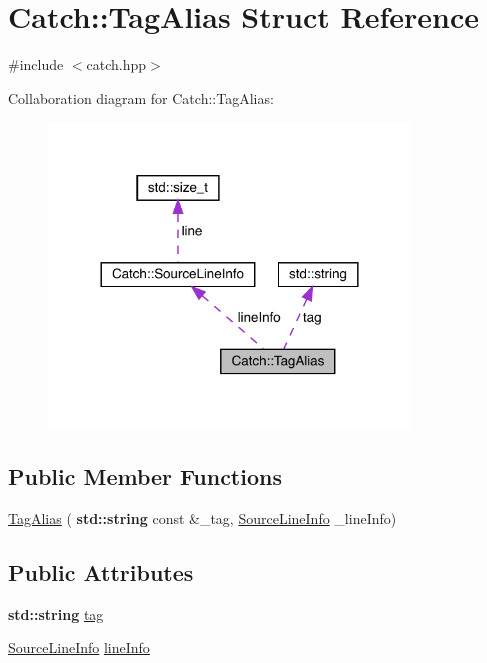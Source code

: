 \hypertarget{struct_catch_1_1_tag_alias}{}\section{Catch\+:\+:Tag\+Alias Struct Reference}
\label{struct_catch_1_1_tag_alias}


{\ttfamily \#include $<$catch.\+hpp$>$}



Collaboration diagram for Catch\+:\+:Tag\+Alias\+:
\nopagebreak
\begin{figure}[H]
\begin{center}
\leavevmode
\includegraphics[width=272pt]{struct_catch_1_1_tag_alias__coll__graph}
\end{center}
\end{figure}
\subsection*{Public Member Functions}
\begin{DoxyCompactItemize}
\item 
\hyperlink{struct_catch_1_1_tag_alias_ae5a030edfbc8e37f28310d4ca599396c}{Tag\+Alias} (\textbf{ std\+::string} const \&\+\_\+tag, \hyperlink{struct_catch_1_1_source_line_info}{Source\+Line\+Info} \+\_\+line\+Info)
\end{DoxyCompactItemize}
\subsection*{Public Attributes}
\begin{DoxyCompactItemize}
\item 
\textbf{ std\+::string} \hyperlink{struct_catch_1_1_tag_alias_a950183883ab17c90d0fab16b966b6e2d}{tag}
\item 
\hyperlink{struct_catch_1_1_source_line_info}{Source\+Line\+Info} \hyperlink{struct_catch_1_1_tag_alias_a2f51fe0b3c052561275d26b6eb88f702}{line\+Info}
\end{DoxyCompactItemize}


